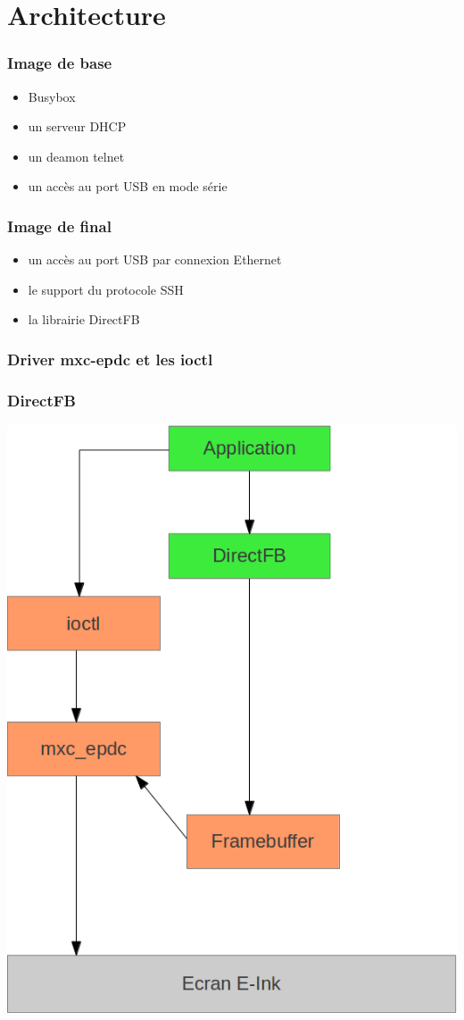 \section{Architecture}
\begin{frame}
\frametitle{Image de base}

\begin{itemize}
\item Busybox
\item un serveur DHCP
\item un deamon telnet
\item un accès au port USB en mode série 
\end{itemize}

\end{frame}

\begin{frame}
\frametitle{Image de final}

\begin{itemize}
\item un accès au port USB par connexion Ethernet
\item le support du protocole SSH
\item la librairie DirectFB
\end{itemize}

\end{frame}

\begin{frame}
\frametitle{Driver mxc-epdc et les ioctl}

\end{frame}

\begin{frame}
\frametitle{DirectFB}

\begin{center}
\includegraphics[scale=0.3]{schema_direct_fb.png}
\end{center}

\end{frame}

